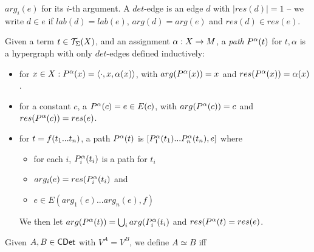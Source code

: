 \documentclass[10pt]{article}
\begin{document}
$arg_{i}(e)$ for its $i$-th argument. A $det$-edge is an edge $d$ 
with $|res(d)|=1$ -- we write $d\in e$ if $lab(d)=lab(e)$, 
$arg(d)=arg(e)$ and $res(d)\in res(e)$.
%
\begin{Definition}
Given a term $t\in{\cal T}_{\Sigma}(X)$, and an 
assignment $\alpha:X\rightarrow M$, a {\em path} $P^{\alpha}(t)$ for $t,\alpha$ 
is a hypergraph with only $det$-edges defined 
inductively:
\begin{itemize}\MyLPar
\item for $x\in X: P^{\alpha}(x) = \langle\cdot,x,\alpha(x)\rangle$, with 
$arg(P^{\alpha}(x))=x$ and $res(P^{\alpha}(x))=\alpha(x)$.
\item for a constant $c$, a $P^{\alpha}(c) = e\in E(c)$, with 
$arg(P^{\alpha}(c))=c$ and $res(P^{\alpha}(c))=res(e)$.
\item for $t=f(t_{1}...t_{n})$, a path $P^{\alpha}(t)$ is 
$[P_{1}^{\alpha}(t_{1})...P_{n}^{\alpha}(t_{n}),e]$ where 
 \begin{itemize}
  \item for each $i$, $P_{i}^{\alpha}(t_{i})$ is a path for $t_{i}$
  \item $arg_{i}(e)=res(P_{i}^{\alpha}(t_{i})$ and 
  \item $e\in E(arg_{1}(e)...arg_{n}(e),f)$
 \end{itemize} 
We then let $arg(P^{\alpha}(t))=\bigcup_{i} 
arg(P_{i}^{\alpha}(t_{i})$ and 
$res(P^{\alpha}(t) = res(e)$.
\end{itemize}
\end{Definition}


 Given 
$A,B\in\mbox{\sf CDet}$ with $V^{A}=V^{B}$, we define $A\simeq B$ iff 
\end{document}

